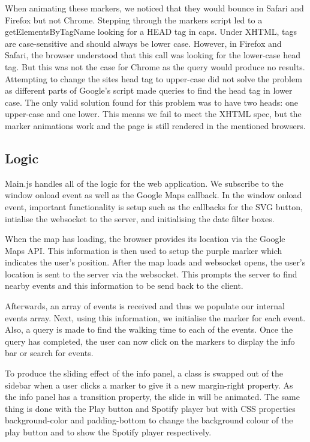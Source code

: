 \documentclass[10pt]{article}
\begin{document}
                When animating these markers, we noticed that they would bounce in Safari and Firefox but not Chrome. Stepping through the markers script led to a getElementsByTagName looking for a HEAD tag in caps. Under XHTML, tags are case-sensitive and should always be lower case. However, in Firefox and Safari, the browser understood that this call was looking for the lower-case head tag. But this was not the case for Chrome as the query would produce no results. Attempting to change the sites head tag to upper-case did not solve the problem as different parts of Google's script made queries to find the head tag in lower case. The only valid solution found for this problem was to have two heads: one upper-case and one lower. This means we fail to meet the XHTML spec, but the marker animations work and the page is still rendered in the mentioned browsers. 

        \subsection{Logic}
            Main.js handles all of the logic for the web application. We subscribe to the window onload event as well as the Google Maps callback. In the window onload event, important functionality is setup such as the callbacks for the SVG button, intialise the websocket to the server, and initialising the date filter boxes.

            When the map has loading, the browser provides its location via the Google Maps API. This information is then used to setup the purple marker which indicates the user's position. After the map loads and websocket opens, the user's location is sent to the server via the websocket. This prompts the server to find nearby events and this information to be send back to the client.

            Afterwards, an array of events is received and thus we populate our internal events array. Next, using this information, we initialise the marker for each event. Also, a query is made to find the walking time to each of the events. Once the query has completed, the user can now click on the markers to display the info bar or search for events.

            To produce the sliding effect of the info panel, a class is swapped out of the sidebar when a user clicks a marker to give it a new margin-right property. As the info panel has a transition property, the slide in will be animated. The same thing is done with the Play button and Spotify player but with CSS properties background-color and padding-bottom to change the background colour of the play button and to show the Spotify player respectively.
\end{document}
